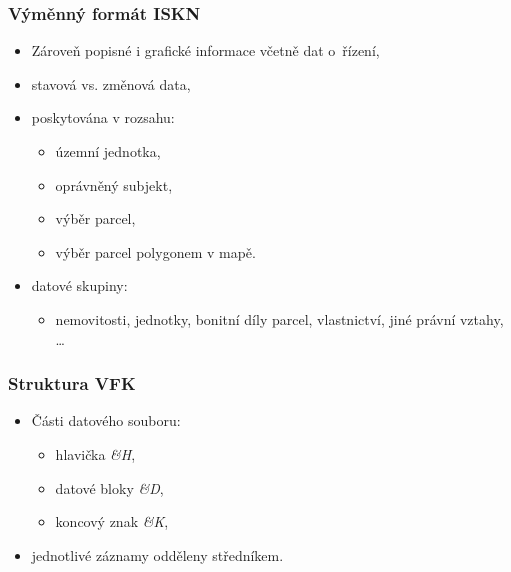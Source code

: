 \documentclass{beamer}
\begin{document}

\begin{frame}
\frametitle{Výměnný formát ISKN}

\begin{itemize}
  \item Zároveň popisné i grafické informace včetně dat o~řízení,
  \item stavová vs. změnová data,
  \item poskytována v rozsahu:
  
  \begin{itemize}
  \item územní jednotka,
  \item oprávněný subjekt,
  \item výběr parcel,
  \item výběr parcel polygonem v mapě.
  \end{itemize}

\item datové skupiny:

  \begin{itemize}
    \item nemovitosti, jednotky, bonitní díly parcel, vlastnictví, jiné právní vztahy, \dots
  \end{itemize}
  
\end{itemize}

\end{frame}


\begin{frame}
\frametitle{Struktura VFK}
 
\begin{itemize}
  \item Části datového souboru:
  
  \begin{itemize}
    \item hlavička \textit{\&H},
    \item datové bloky \textit{\&D},
    \item koncový znak \textit{\&K},
  \end{itemize}
  
  \item jednotlivé záznamy odděleny středníkem.

\end{itemize}

\end{frame}
\end{document}
